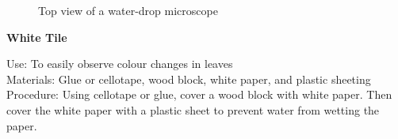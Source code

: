 \begin{figure}[h!]
\begin{center}
\def\svgwidth{350pt}

\caption{Top view of a water-drop microscope}
\label{fig:microscope-top}
\end{center}
\end{figure}

\begin{flushleft}
\textbf{White Tile}
\end{flushleft}
\vspace{-10pt}
Use: To easily observe colour changes in leaves\\
Materials: Glue or cellotape, wood block, white paper, and plastic sheeting\\
Procedure: Using cellotape or glue, cover a wood block with white paper. Then cover the white paper with a plastic sheet to prevent water from wetting the paper.

